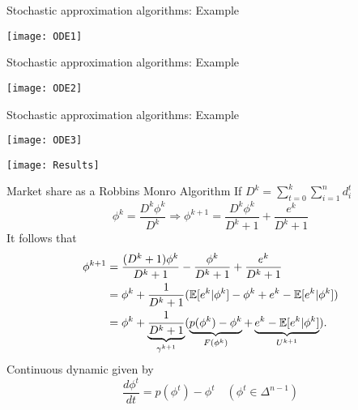 \addtocounter{framenumber}{-1}
{
\begin{frame}[c]{Stochastic approximation algorithms: Example}
\begin{center}
{\texttt{[image: ODE1]}}
\end{center}
\end{frame}
}
\addtocounter{framenumber}{-1}
{
\begin{frame}[c]{Stochastic approximation algorithms: Example}
\begin{center}
{\texttt{[image: ODE2]}}
\end{center}
\end{frame}
}
\addtocounter{framenumber}{-1}
{
\begin{frame}[c]{Stochastic approximation algorithms: Example}
\begin{center}
{\texttt{[image: ODE3]}}
\end{center}
\end{frame}
}

\addtocounter{framenumber}{-1}
{	
\begin{frame}[c]
\begin{center}

	\vspace{10em}
	 \texttt{[image: Results]}\\
	\vspace{.5em}
	
\end{center}
\end{frame}
}



\begin{frame}[c]{Market share as a Robbins Monro Algorithm}
If  $D^k = \sum_{t=0}^k \sum_{i=1}^n d_i^t$
\[\phi^{k} = \frac{D^k \phi^k}{D^k } \Rightarrow
\phi^{k+1} = \frac{D^k \phi^k}{D^k + 1} + \frac{e^k}{D^k + 1}
\]
It follows that 
\begin{align*}
\phi^{k+1} & =  \frac{(D^k+1) \phi^k}{D^k + 1} - \frac{\phi^k}{D^k + 1}  + \frac{e^k}{D^k + 1} \\
          & =  \phi^k + \frac{1}{D^k + 1} (\mathbb{E}[e^k | \phi^k] - \phi^k + e^k - \mathbb{E}[e^k | \phi^k]) \\
          & =  \phi^k + \underbrace{\frac{1}{D^k + 1}}_{\gamma^{k+1} } (\underbrace{p(\phi^k) - \phi^k}_{F(\phi^k) } + \underbrace{e^k - \mathbb{E}[e^k | \phi^k]}_{U^{k+1}}).
\end{align*}
Continuous dynamic given by
\begin{equation}
\label{RMC-MS}
\frac{d\phi^t}{dt}= p(\phi^t) - \phi^t \quad (\phi^t \in \Delta^{n-1}) 
\end{equation}

\end{frame}


